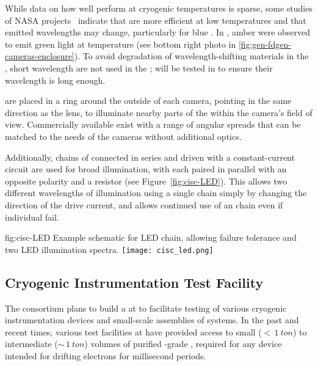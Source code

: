 While data on how well  perform at cryogenic temperatures
is sparse, some studies of NASA projects~\cite{Carron:2017zzz}
indicate that  are more efficient at low temperatures and
that emitted wavelengths may change, particularly for blue
.  In , amber  were observed  to
emit green light at  temperature (see bottom right photo
in \ref{fig:gen-fdgen-cameras-enclosure}).  To avoid degradation of
wavelength-shifting materials in the , short wavelength
 are not used in the ;  will be tested
in  to ensure their wavelength is long enough.


 are placed in a ring around the outside of each
camera, pointing in the same direction as the lens, to 
illuminate nearby parts of the  within the camera's field of
view. Commercially available  exist with
a range of angular spreads that can be matched to the needs of the
cameras without additional optics.

Additionally, chains of  connected in series and driven with a
constant-current circuit are used for broad illumination, with each
 paired in parallel with an opposite polarity  and a resistor
(see Figure~\ref{fig:cisc-LED}).
This allows two different wavelengths of illumination using a single chain simply by changing the direction of the drive current, and allows continued use of an  chain even if individual  fail.

\begin{dunefigure}{fig:cisc-LED}
  {Example schematic for LED chain, allowing failure tolerance and two LED illumination spectra.}
  \texttt{[image: cisc\_led.png]}
\end{dunefigure}


\subsection{Cryogenic Instrumentation Test Facility}
The  consortium plans to build a  at  to facilitate testing of various cryogenic instrumentation devices and small-scale assemblies of  systems. 
In the past and recent times, various test facilities at  have provided access to small ($<\,\SI{1}{ton}$) to intermediate ($\sim\,\SI{1}{ton}$) volumes of purified -grade , required for %
any device intended for drifting electrons for millisecond periods. 


